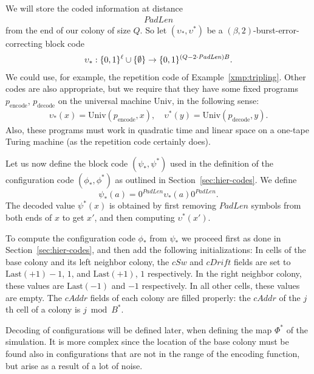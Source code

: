 \documentclass[12pt]{memoir}
\newcommand{\fld}[1]{\ensuremath{\textit{#1}}}
\renewcommand{\B}{B}
\newcommand{\cAddr}{\fld{cAddr}}
\newcommand{\cDrift}{\fld{cDrift}}
\newcommand{\cSweep}{\fld{cSw}}
\newcommand{\decode}{\mathrm{decode}}
\newcommand{\encode}{\mathrm{encode}}
\newcommand{\Last}{\mathrm{Last}}
\newcommand{\PadLen}{\mathit{PadLen}}
\newcommand{\Un}{\mathrm{Univ}}
\begin{document}
We will store the coded information at distance 
\begin{align}\label{eq:penLen}
    \PadLen
\end{align}
from the end of our colony of size \( Q \).
So let $(\upsilon_{*}, \upsilon^{*})$ be a $(\beta,2)$-burst-error-correcting block code
\begin{align*}
  \upsilon_{*}: \{0,1\}^{\ell} \cup \set{\emptyset}
   \to\{0,1\}^{(Q-2\cdot\PadLen)\B}.
\end{align*}
We could use, for example, the repetition code of Example~\ref{xmp:tripling}.
Other codes are also appropriate, but we require that they have some fixed
programs $p_{\encode}$, $p_{\decode}$
on the universal machine $\Un$, in the following sense:
 \begin{align*}
   \upsilon_{*}(x)=\Un(p_{\encode},x),\quad
   \upsilon^{*}(y)=\Un(p_{\decode}, y).
 \end{align*}
Also, these programs must work in quadratic time and
linear space on a one-tape Turing machine (as the repetition code certainly does).

Let us now define the block code $(\psi_*, \psi^*)$ used in the
definition of the configuration code $(\phi_*, \phi^*)$ as 
outlined in Section~\ref{sec:hier-codes}.
We define
\begin{equation}\label{eq:psi}
   \psi_*(a)  = 0^{\PadLen}\upsilon_{*}(a)0^{\PadLen}.
\end{equation}
The decoded value \( \psi^{*}(x) \) is obtained by first removing \( \PadLen \) symbols
from both ends of \( x \) to get \( x' \), and then computing \( \upsilon^{*}(x') \).

To compute the configuration code \( \phi_{*} \) from \( \psi_{*} \) we proceed first as
done in Section~\ref{sec:hier-codes}, and then add the following initializations:
In cells of the base colony and its left neighbor  colony,
the $\cSweep$ and $\cDrift$ fields are set 
to $\Last(+1)-1$,  $1$, and $\Last(+1)$,  $1$ respectively.
In the right neighbor colony, these values are $\Last(-1)$ and $-1$ respectively.
In all other cells, these values are empty.
The $\cAddr$ fields of each colony are filled properly:
the $\cAddr$ of the $j$th cell of a colony
is $j \bmod \B^*$.

Decoding of configurations will be defined later, 
when defining the map \( \Phi^{*} \) of the simulation.
It is more complex since 
the location of the base colony must be found also in
configurations that are not in the range of the encoding
function, but arise as a result of a lot of noise.
\end{document}
